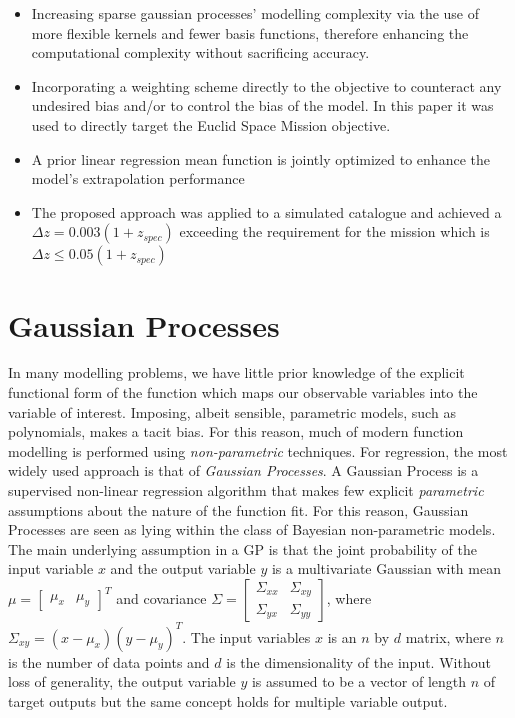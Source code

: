 \documentclass[useAMS,usenatbib,fleqn]{mn2e}
\begin{document}
\begin{itemize}
  \item Increasing sparse gaussian processes' modelling complexity via the use of more flexible kernels and fewer basis functions, therefore enhancing the computational complexity without sacrificing accuracy.
  \item Incorporating a weighting scheme directly to the objective to counteract any undesired bias and/or to control the bias of the model. In this paper it was used to directly target the Euclid Space Mission objective.
  \item A prior linear regression mean function is jointly optimized to enhance the model's extrapolation performance
  \item The proposed approach was applied to a simulated catalogue and achieved  a $\Delta z = 0.003(1+z_{spec})$ exceeding the requirement for the mission which is $\Delta z \le 0.05(1+z_{spec})$
\end{itemize}

\section{Gaussian Processes}
\label{sec-gaussian-process}
In many modelling problems, we have little prior knowledge of the explicit functional form of the function which maps our observable variables into the variable of interest. Imposing, albeit sensible, parametric models, such as polynomials, makes a tacit bias. For this reason, much of modern function modelling is performed using \emph{non-parametric} techniques. For regression, the most widely used approach is that of \emph{Gaussian Processes}.
A Gaussian Process is a supervised non-linear regression algorithm that makes few explicit \emph{parametric} assumptions about the nature of the function fit. For this reason, Gaussian Processes are seen as lying within the class of Bayesian non-parametric models. The main underlying assumption in a GP is that the joint probability of the input variable $x$ and the output variable $y$ is a multivariate Gaussian with mean $\mu=\begin{bmatrix} \mu_{x} & \mu_{y}\end{bmatrix}^{T}$ and covariance $\Sigma=\begin{bmatrix}\Sigma_{xx} & \Sigma_{xy}\\\Sigma_{yx} & \Sigma_{yy} \end{bmatrix}$, where $\Sigma_{xy}=(x-\mu_{x})(y-\mu_{y})^{T}$. The input variables $x$ is an $n$ by $d$ matrix, where $n$ is the number of data points and $d$ is the dimensionality of the input. Without loss of generality, the output variable $y$ is assumed to be a vector of length $n$ of target outputs but the same concept holds for multiple variable output.
\end{document}
